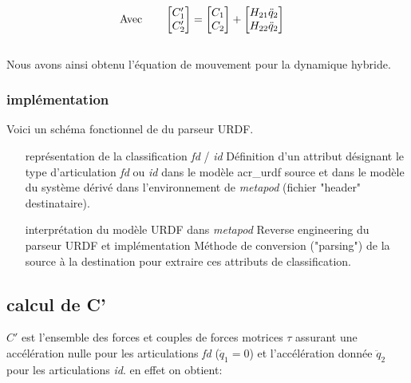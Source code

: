 \documentclass{report}
\begin{document}
\begin{align*}
&\textnormal{Avec} \qquad
\begin{bmatrix}
  C'_{1} \\
  C'_{2}
\end{bmatrix}
=
\begin{bmatrix}
  C_{1} \\
  C_{2}
\end{bmatrix}
+
\begin{bmatrix}
  H_{21} \ddot{q}_2 \\
  H_{22} \ddot{q}_2
\end{bmatrix}
\end{align*}
\\
Nous avons ainsi obtenu l'équation de mouvement pour la dynamique hybride.

\subsubsection{implémentation}

Voici un schéma fonctionnel de du parseur URDF.


\begin{itemize}
  \item[représentation de la classification \emph{fd} / \emph{id}] Définition d'un attribut désignant le type d'articulation \emph{fd} ou \emph{id} dans le modèle \gls{acr_urdf} source et dans le modèle du système dérivé dans l'environnement de \emph{metapod} (fichier "header" destinataire).
  \item[interprétation du modèle URDF dans \emph{metapod}] Reverse engineering du parseur URDF et implémentation Méthode de conversion ("parsing") de la source à la destination pour extraire ces attributs de classification.
\end{itemize}


\subsection{calcul de C'}

$C'$ est l'ensemble des forces et couples de forces motrices $\tau$ assurant une accélération nulle pour les articulations \emph{fd} ($\ddot{q}_1=0$) et l'accélération donnée $\ddot{q}_2$ pour les articulations \emph{id}. en effet on obtient:
\end{document}
